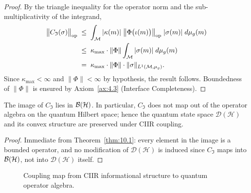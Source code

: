 \begin{proof}
By the triangle inequality for the operator norm and the sub-multiplicativity
of the integrand,
\begin{align*}
  \bigl\|C_{\mathfrak{I}}(\sigma)\bigr\|_{\mathrm{op}}
  &\;\leq\;
  \int_{\mathcal{M}}
  |\kappa(m)|\;\bigl\|\Phi\bigl(\iota(m)\bigr)\bigr\|_{\mathrm{op}}\;
  |\sigma(m)|\;d\mu_g(m) \\
  &\;\leq\;
  \kappa_{\max}\cdot\|\Phi\|
  \int_{\mathcal{M}}|\sigma(m)|\;d\mu_g(m) \\
  &\;=\;
  \kappa_{\max}\cdot\|\Phi\|\cdot\|\sigma\|_{L^1(\mathcal{M},\mu_g)}.
\end{align*}
Since $\kappa_{\max}<\infty$ and $\|\Phi\|<\infty$ by hypothesis, the
result follows.  Boundedness of $\|\Phi\|$ is ensured by
Axiom~\ref{ax:4.3} (Interface Completeness).
\end{proof}

\begin{corollary}
\label{cor:10.1}
The image of $C_{\mathfrak{I}}$ lies in $\mathcal{B}(\mathcal{H})$.  In
particular, $C_{\mathfrak{I}}$ does not map out of the operator algebra
on the quantum Hilbert space; hence the quantum state space
$\mathcal{D}(\mathcal{H})$ and its convex structure are preserved
under CIIR coupling.
\end{corollary}

\begin{proof}
Immediate from Theorem~\ref{thm:10.1}: every element in the image is
a bounded operator, and no modification of $\mathcal{D}(\mathcal{H})$
is induced since $C_{\mathfrak{I}}$ maps into $\mathcal{B}(\mathcal{H})$, not
into $\mathcal{D}(\mathcal{H})$ itself.
\end{proof}

\begin{figure}[t]
\centering
{}
\caption{Coupling map from CIIR informational structure to quantum
  operator algebra.}
\label{fig:c10:coupling}
\end{figure}

